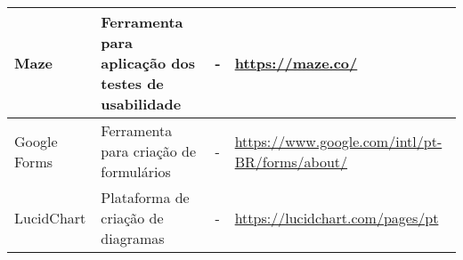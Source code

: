 \begin{table}[h]
\begin{adjustbox}{center}
{\begin{tabular}{l|l|l|l}
        Maze               & Ferramenta para aplicação dos testes de usabilidade           & -                                                                   & \href{https://maze.co/}{https://maze.co/}            \\ \hline
        Google Forms       & Ferramenta para criação de formulários                        & -                                                                   & \href{https://www.google.com/intl/pt-BR/forms/about/}{https://www.google.com/intl/pt-BR/forms/about/}            \\ \hline
        LucidChart         & Plataforma de criação de diagramas                            & -                                                                   & \href{https://lucidchart.com/pages/pt}{https://lucidchart.com/pages/pt}            \\ \hline
    \end{tabular}}
    \end{adjustbox}
\end{table}